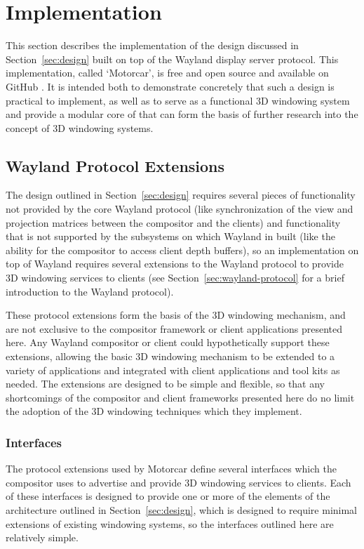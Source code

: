 \chapter{Implementation}
\label{sec:implementation}
This section describes the implementation of the design discussed in Section~\ref{sec:design} built on top of the Wayland display server protocol. This implementation, called `Motorcar', is free and open source and available on GitHub \cite{motorcar-github}. It is intended both to demonstrate concretely that such a design is practical to implement, as well as to serve as a functional 3D windowing system and provide a modular core of that can form the basis of further research into the concept of 3D windowing systems.

\section{Wayland Protocol Extensions}

The design outlined in Section~\ref{sec:design} requires several pieces of functionality not provided by the core Wayland protocol (like synchronization of the view and projection matrices between the compositor and the clients) and functionality that is not supported by the subsystems on which Wayland in built (like the ability for the compositor to access client depth buffers), so an implementation on top of Wayland requires several extensions to the Wayland protocol to provide 3D windowing services to clients (see Section~\ref{sec:wayland-protocol} for a brief introduction to the Wayland protocol).

These protocol extensions form the basis of the 3D windowing mechanism, and are not exclusive to the compositor framework or client applications presented here. Any Wayland compositor or client could hypothetically support these extensions, allowing the basic 3D windowing mechanism to be extended to a variety of applications and integrated with client applications and tool kits as needed. The extensions are designed to be simple and flexible, so that any shortcomings of the compositor and client frameworks presented here do no limit the adoption of the 3D windowing techniques which they implement.

\subsection{Interfaces}

The protocol extensions used by Motorcar define several interfaces which the compositor uses to advertise and provide 3D windowing services to clients. Each of these interfaces is designed to provide one or more of the elements of the architecture outlined in Section~\ref{sec:design}, which is designed to require minimal extensions of existing windowing systems, so the interfaces outlined here are relatively simple.

